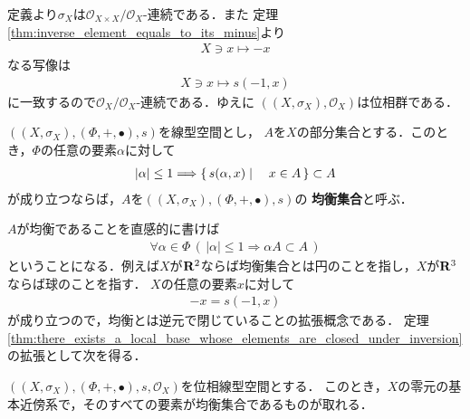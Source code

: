 	\begin{sketch}
		定義より$\sigma_X$は$\mathscr{O}_{X \times X}/\mathscr{O}_X$-連続である．また
		定理\ref{thm:inverse_element_equals_to_its_minus}より
		\begin{align}
			X \ni x \longmapsto -x
		\end{align}
		なる写像は
		\begin{align}
			X \ni x \longmapsto s(-1,x)
		\end{align}
		に一致するので$\mathscr{O}_X/\mathscr{O}_X$-連続である．ゆえに
		$\left(\left(X,\sigma_X\right),\mathscr{O}_X\right)$は位相群である．
		\QED
	\end{sketch}
	
	\begin{screen}
		\begin{dfn}[均衡集合]
			$\left(\left(X,\sigma_X\right),(\Phi,+,\bullet),s\right)$を線型空間とし，
			$A$を$X$の部分集合とする．このとき，$\Phi$の任意の要素$\alpha$に対して
			\begin{align}
				|\alpha| \leq 1 \Longrightarrow \left\{\, s(\alpha,x) \mid \quad x \in A\, \right\} \subset A
			\end{align}
			が成り立つならば，$A$を$\left(\left(X,\sigma_X\right),(\Phi,+,\bullet),s\right)$の
			{\bf 均衡集合}と呼ぶ．
		\end{dfn}
	\end{screen}
	
	$A$が均衡であることを直感的に書けば
	\begin{align}
		\forall \alpha \in \Phi\,
		\left(\, |\alpha| \leq 1 \Longrightarrow \alpha A \subset A\, \right)
	\end{align}
	ということになる．例えば$X$が$\mathbf{R}^2$ならば均衡集合とは円のことを指し，$X$が$\mathbf{R}^3$ならば球のことを指す．
	$X$の任意の要素$x$に対して
	\begin{align}
		-x = s(-1,x)
	\end{align}
	が成り立つので，均衡とは逆元で閉じていることの拡張概念である．
	定理\ref{thm:there_exists_a_local_base_whose_elements_are_closed_under_inversion}の拡張として次を得る．
	
	\begin{screen}
		\begin{thm}[均衡な局所基が取れる]
			$\left(\left(X,\sigma_X\right),(\Phi,+,\bullet),s,\mathscr{O}_X\right)$を位相線型空間とする．
			このとき，$X$の零元の基本近傍系で，そのすべての要素が均衡集合であるものが取れる．
		\end{thm}
	\end{screen}
	
